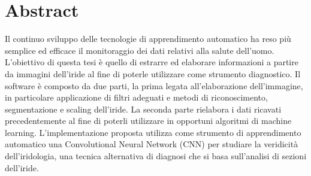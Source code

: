 \thispagestyle{plain}
\chapter*{Abstract}

Il continuo sviluppo delle tecnologie di apprendimento automatico ha reso più semplice ed efficace il monitoraggio dei dati relativi alla salute dell’uomo. L’obiettivo di questa tesi è quello di estrarre ed elaborare informazioni a partire da immagini dell’iride al fine di poterle utilizzare come strumento diagnostico. Il software è composto da due parti, la prima legata all’elaborazione dell’immagine, in particolare applicazione di filtri adeguati e metodi di riconoscimento, segmentazione e scaling dell’iride. La seconda parte rielabora i dati ricavati precedentemente al fine di poterli utilizzare in opportuni algoritmi di machine learning. L'implementazione proposta utilizza come strumento di apprendimento automatico una Convolutional Neural Network (CNN) per studiare la veridicità dell’iridologia, una tecnica alternativa di diagnosi che si basa sull’analisi di sezioni dell’iride.
